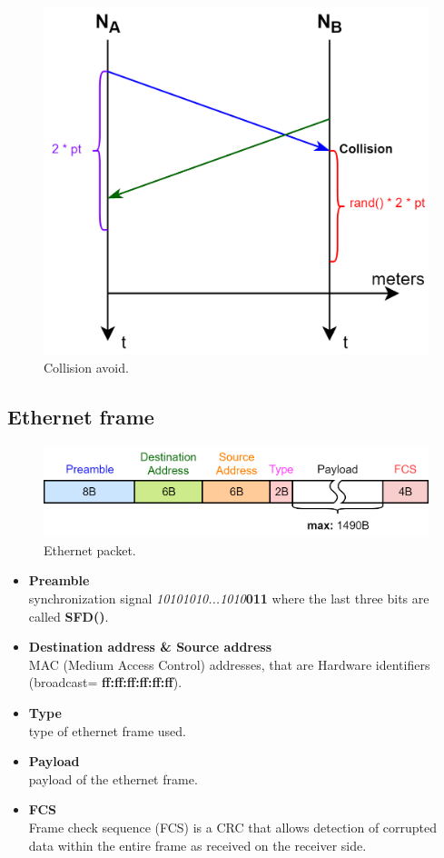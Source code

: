 \begin{figure}[H]
\centering
\includegraphics[scale=0.3]{Images/Layer2/collision_avoid}
\caption{\footnotesize{Collision avoid.}}\label{collision_avoid}
\end{figure}

\subsection{Ethernet frame}
\begin{figure}[H]
\centering
\includegraphics[scale=0.3]{Images/Layer2/layer2_message}
\caption{\footnotesize{Ethernet packet.}}\label{layer2_message}
\end{figure}
\begin{itemize}
\item{\textbf{Preamble}\\
synchronization signal \textit{10101010...1010}\textbf{011} where the last three bits are called \textbf{SFD()}.
}
\item{\textbf{Destination address \& Source address}\\
MAC (Medium Access Control) addresses, that are Hardware identifiers (broadcast= \textbf{ff:ff:ff:ff:ff:ff}).  
}
\item{\textbf{Type}\\
type of ethernet frame used.
}
\item{\textbf{Payload}\\
payload of the ethernet frame.
}
\item{\textbf{FCS}\\
Frame check sequence (FCS) is a CRC that allows detection of corrupted data within the entire frame as received on the receiver side.
}
\end{itemize}

